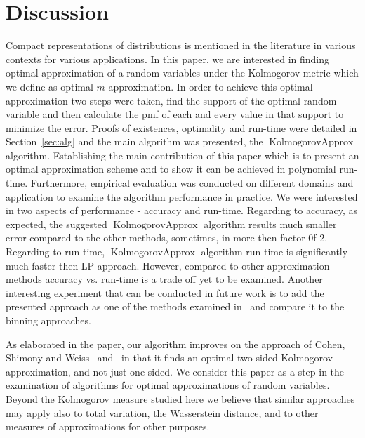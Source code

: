 \documentclass{article}
\DeclareMathOperator{\KlmApprox}{KolmogorovApprox}
\begin{document}
\section{Discussion}\label{sec:discussion}
Compact representations of distributions is mentioned in the literature in various contexts for various applications. In this paper, we are interested in finding optimal approximation of a random variables under the Kolmogorov metric which we define as optimal $m$-approximation. In order to achieve this optimal approximation two steps were taken, find the support of the optimal random variable and then calculate the pmf of each and every value in that support to minimize the error. Proofs of existences, optimality and run-time were detailed in Section~\ref{sec:alg} and the main algorithm was presented, the $\KlmApprox$ algorithm. Establishing the main contribution of this paper which is to present an optimal approximation scheme and to show it can be achieved in polynomial run-time. Furthermore, empirical evaluation was conducted on different domains and application to examine the algorithm performance in practice. We were interested in two aspects of performance - accuracy and run-time. Regarding to accuracy, as expected, the suggested $\KlmApprox$ algorithm results much smaller error compared to the other methods, sometimes, in more then factor 0f 2. Regarding to run-time, $\KlmApprox$ algorithm run-time is significantly much faster then LP approach. However, compared to other approximation methods accuracy vs. run-time is a trade off yet to be examined. Another interesting experiment that can be conducted in future work is to add the presented approach as one of the methods examined in~\cite{zeng2017comparison} and compare it to the binning approaches.

As elaborated in the paper, our algorithm improves on the approach of Cohen, Shimony and Weiss~\cite{cohen2015estimating} and~\cite{CohenGW18} in that it finds an optimal two sided Kolmogorov approximation, and not just one sided. We consider this paper as a step in the examination of algorithms for optimal approximations of random variables. Beyond the Kolmogorov measure studied here we believe that similar approaches may apply also to total variation, the Wasserstein distance, and to other measures of approximations for other purposes.


{}

\end{document}
